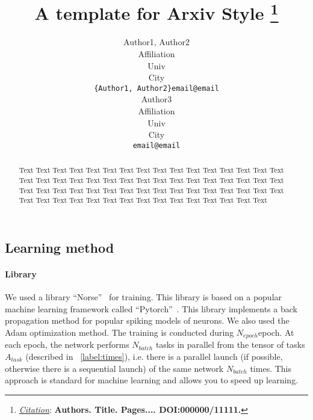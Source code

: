 \documentclass{article}
\title{A template for Arxiv Style
\thanks{\textit{\underline{Citation}}: 
\textbf{Authors. Title. Pages.... DOI:000000/11111.}} 
}
\author{
  Author1, Author2 \\
  Affiliation \\
  Univ \\
  City\\
  \texttt{\{Author1, Author2\}email@email} \\
   \And
  Author3 \\
  Affiliation \\
  Univ \\
  City\\
  \texttt{email@email} \\
}
\begin{document}
\maketitle


\begin{abstract}
  Text Text Text
  Text Text Text
  Text Text Text
  Text Text Text
  Text Text Text
  Text Text Text
  Text Text Text
  Text Text Text
  Text Text Text
  Text Text Text
  Text Text Text
  Text Text Text
  Text Text Text
  Text Text Text
  Text Text Text
  Text Text Text
  Text Text Text
  Text Text Text
  Text Text Text
  Text Text Text
  Text Text Text
\end{abstract}



\subsection{Learning method}
\paragraph{Library}
We used a library ``Norse''~\cite{norse2021} for training. This library is based on a popular machine learning framework called ``Pytorch''~\cite{NEURIPS2019_9015}. This library implements a back propagation method for popular spiking models of neurons. We also used the Adam optimization method. The training is conducted during $N_{epoch}$epoch. At each epoch, the network performs $N_{batch}$ tasks in parallel from the tensor of tasks $A_{task}$ (described in ~\ref{label:times}), i.e. there is a parallel launch (if possible, otherwise there is a sequential launch) of the same network $N_{batch}$ times. This approach is standard for machine learning and allows you to speed up learning.
\end{document}
